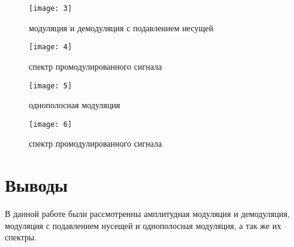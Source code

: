 \begin{figure}[H]
	\begin{center}
		\texttt{[image: 3]}
		\caption{модуляция и демодуляция с подавлением несущей} 
		\label{pic:triangle_spectrum} %
	\end{center}
\end{figure}

\begin{figure}[H]
	\begin{center}
		\texttt{[image: 4]}
		\caption{спектр промодулированного сигнала} 
		\label{pic:triangle_spectrum} %
	\end{center}
\end{figure}

\begin{figure}[H]
	\begin{center}
		\texttt{[image: 5]}
		\caption{однополосная модуляция} 
		\label{pic:triangle_spectrum} %
	\end{center}
\end{figure}

\begin{figure}[H]
	\begin{center}
		\texttt{[image: 6]}
		\caption{спектр промодулированного сигнала} 
		\label{pic:triangle_spectrum} %
	\end{center}
\end{figure}

\section{Выводы}
В данной работе были рассмотренны амплитудная модуляция и демодуляция, модуляция с подавлением нусещей и однополосная модуляция, а так же их спектры. 

